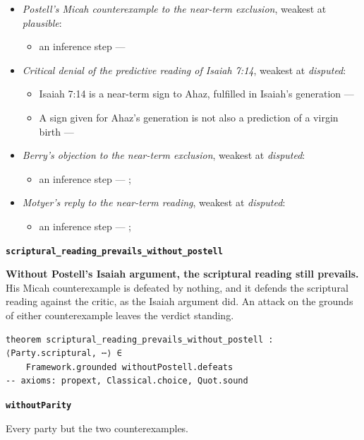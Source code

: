 \documentclass[11pt]{article}
\begin{document}
\begin{itemize}
\begin{itemize}
\end{itemize}
\item \emph{Postell's Micah counterexample to the near-term exclusion}, weakest at \emph{plausible}:
\begin{itemize}
\item an inference step --- \cite[481]{postell-isaiah-messianic-2025}
\end{itemize}
\item \emph{Critical denial of the predictive reading of Isaiah 7:14}, weakest at \emph{disputed}:
\begin{itemize}
\item Isaiah 7:14 is a near-term sign to Ahaz, fulfilled in Isaiah's generation --- \cite{brown-birth-messiah-1993}
\item A sign given for Ahaz's generation is not also a prediction of a virgin birth --- \cite{brown-birth-messiah-1993}
\end{itemize}
\item \emph{Berry's objection to the near-term exclusion}, weakest at \emph{disputed}:
\begin{itemize}
\item an inference step --- \cite[1653--1654]{berry-virgin-birth-2003}; \cite[5]{compton-immanuel-prophecy-2007}
\end{itemize}
\item \emph{Motyer's reply to the near-term reading}, weakest at \emph{disputed}:
\begin{itemize}
\item an inference step --- \cite[124]{motyer-context-content-1970}; \cite[5]{compton-immanuel-prophecy-2007}
\end{itemize}
\end{itemize}
\par\medskip\noindent\textbf{\texttt{scriptural\_\allowbreak{}reading\_\allowbreak{}prevails\_\allowbreak{}without\_\allowbreak{}postell}}\par\nobreak\noindent
\textbf{Without Postell's Isaiah argument, the scriptural reading still prevails.} His Micah counterexample is defeated by nothing, and it defends the scriptural reading against the critic, as the Isaiah argument did. An attack on the grounds of either counterexample leaves the verdict standing.

{\small\begin{verbatim}
theorem scriptural_reading_prevails_without_postell : ⟨Party.scriptural, ⋯⟩ ∈
    Framework.grounded withoutPostell.defeats
-- axioms: propext, Classical.choice, Quot.sound
\end{verbatim}}
\par\medskip\noindent\textbf{\texttt{without\allowbreak{}Parity}}\par\nobreak\noindent
Every party but the two counterexamples.
\end{document}
